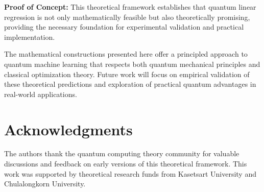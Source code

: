\documentclass[11pt]{article}
\newenvironment{concept}
{\begin{framed}
\noindent\textbf{Proof of Concept:} }
{\end{framed}}
\begin{document}
\begin{concept}
This theoretical framework establishes that quantum linear regression is not only mathematically feasible but also theoretically promising, providing the necessary foundation for experimental validation and practical implementation.
\end{concept}

The mathematical constructions presented here offer a principled approach to quantum machine learning that respects both quantum mechanical principles and classical optimization theory. Future work will focus on empirical validation of these theoretical predictions and exploration of practical quantum advantages in real-world applications.

\section*{Acknowledgments}

The authors thank the quantum computing theory community for valuable discussions and feedback on early versions of this theoretical framework. This work was supported by theoretical research funds from Kasetsart University and Chulalongkorn University.
\end{document}
